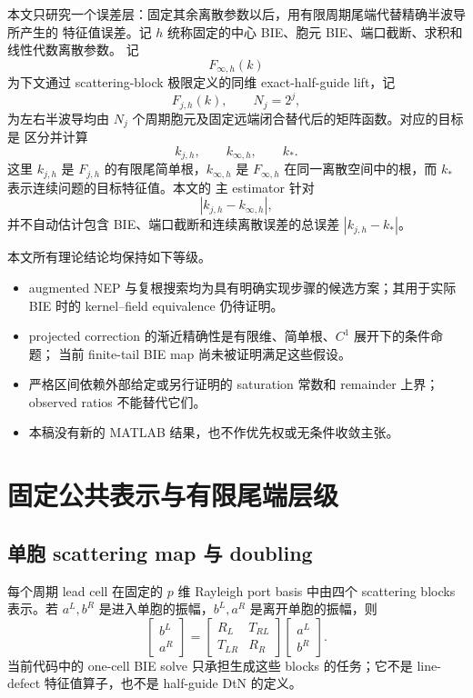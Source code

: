 \documentclass[UTF8,fontset=fandol,11pt,a4paper]{ctexart}
\begin{document}
本文只研究一个误差层：固定其余离散参数以后，用有限周期尾端代替精确半波导所产生的
特征值误差。记 $h$ 统称固定的中心 BIE、胞元 BIE、端口截断、求积和线性代数离散参数。
记
\[
  F_{\infty,h}(k)
\]
为下文通过 scattering-block 极限定义的同维 exact-half-guide lift，记
\[
  F_{j,h}(k),\qquad N_j=2^j,
\]
为左右半波导均由 $N_j$ 个周期胞元及固定远端闭合替代后的矩阵函数。对应的目标是
区分并计算
\[
  k_{j,h},\qquad k_{\infty,h},\qquad k_*.
\]
这里 $k_{j,h}$ 是 $F_{j,h}$ 的有限尾简单根，$k_{\infty,h}$ 是
$F_{\infty,h}$ 在同一离散空间中的根，而 $k_*$ 表示连续问题的目标特征值。本文的
主 estimator 针对
\[
  |k_{j,h}-k_{\infty,h}|,
\]
并不自动估计包含 BIE、端口截断和连续离散误差的总误差
$|k_{j,h}-k_*|$。

本文所有理论结论均保持如下等级。
\begin{itemize}
  \item augmented NEP 与复根搜索均为具有明确实现步骤的候选方案；其用于实际 BIE 时的
  kernel--field equivalence 仍待证明。
  \item projected correction 的渐近精确性是有限维、简单根、$C^1$ 展开下的条件命题；
  当前 finite-tail BIE map 尚未被证明满足这些假设。
  \item 严格区间依赖外部给定或另行证明的 saturation 常数和 remainder 上界；
  observed ratios 不能替代它们。
  \item 本稿没有新的 MATLAB 结果，也不作优先权或无条件收敛主张。
\end{itemize}

\section{固定公共表示与有限尾端层级}

\subsection{单胞 scattering map 与 doubling}

每个周期 lead cell 在固定的 $p$ 维 Rayleigh port basis 中由四个 scattering blocks
表示。若 $a^L,b^R$ 是进入单胞的振幅，$b^L,a^R$ 是离开单胞的振幅，则
\[
  \begin{bmatrix}b^L\\a^R\end{bmatrix}
  =
  \begin{bmatrix}
    R_L&T_{RL}\\
    T_{LR}&R_R
  \end{bmatrix}
  \begin{bmatrix}a^L\\b^R\end{bmatrix}.
\]
当前代码中的 one-cell BIE solve 只承担生成这些 blocks 的任务；它不是 line-defect
特征值算子，也不是 half-guide DtN 的定义。
\end{document}
